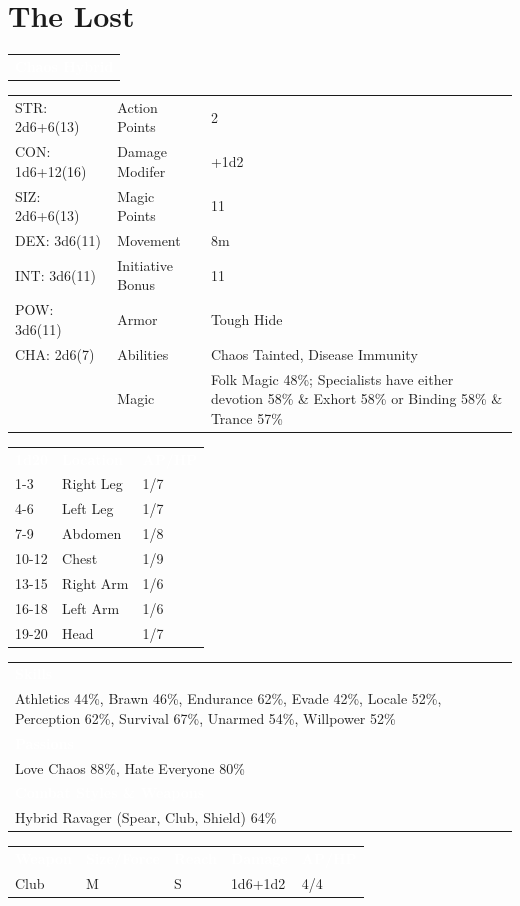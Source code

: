 \documentclass[letterpaper,serif]{rpg-module}
\begin{document}
\section{The Lost}
\label{npcs}

\begin{tabularx}{\linewidth}{X}
\rowcolor{gray}
\textcolor{white}{\textbf{Chaos Hybrid}}
\end{tabularx}
\begin{tabularx}{\linewidth}{XXX}
STR: 2d6+6(13) & Action Points & 2 \\
CON: 1d6+12(16) & Damage Modifer & +1d2 \\
SIZ: 2d6+6(13) & Magic Points & 11 \\
DEX: 3d6(11) & Movement & 8m \\
INT: 3d6(11) & Initiative Bonus & 11 \\
POW: 3d6(11) & Armor & Tough Hide \\
CHA: 2d6(7) & Abilities & Chaos Tainted, Disease Immunity \\
    & Magic & Folk Magic 48\%; Specialists have either devotion 58\% \& Exhort 58\% or Binding 58\% \& Trance 57\%
\end{tabularx}
\begin{tabularx}{\linewidth}{XXX}
\rowcolor{gray}
\textcolor{white}{\textbf{1d20}} & \textcolor{white}{\textbf{Location}} & \textcolor{white}{\textbf{AP/HP}} \\
1-3 & Right Leg & 1/7 \\
4-6 & Left Leg & 1/7 \\
7-9 & Abdomen & 1/8 \\
10-12 & Chest & 1/9 \\
13-15 & Right Arm & 1/6 \\
16-18 & Left Arm & 1/6 \\
19-20 & Head & 1/7 
\end{tabularx}
\begin{tabularx}{\linewidth}{X}
\rowcolor{gray}
\textcolor{white}{\textbf{Skills}} \\
Athletics 44\%, Brawn 46\%, Endurance 62\%, Evade 42\%, Locale 52\%, Perception 62\%, Survival 67\%, Unarmed 54\%, Willpower 52\%\\
\rowcolor{gray}
\textcolor{white}{\textbf{Passions}} \\
Love Chaos 88\%, Hate Everyone 80\% \\
\rowcolor{gray}
\textcolor{white}{\textbf{Combat Styles \& Weapons}} \\
Hybrid Ravager (Spear, Club, Shield) 64\%
\end{tabularx}
\begin{tabularx}{\linewidth}{XXXXX}
\rowcolor{gray}
\textcolor{white}{\textbf{Weapon}} & \textcolor{white}{\textbf{Size/Force}} & \textcolor{white}{\textbf{Reach}} & \textcolor{white}{\textbf{Damage}} & \textcolor{white}{\textbf{AP/HP}} \\
Club & M & S & 1d6+1d2 & 4/4
\end{tabularx}
\end{document}
